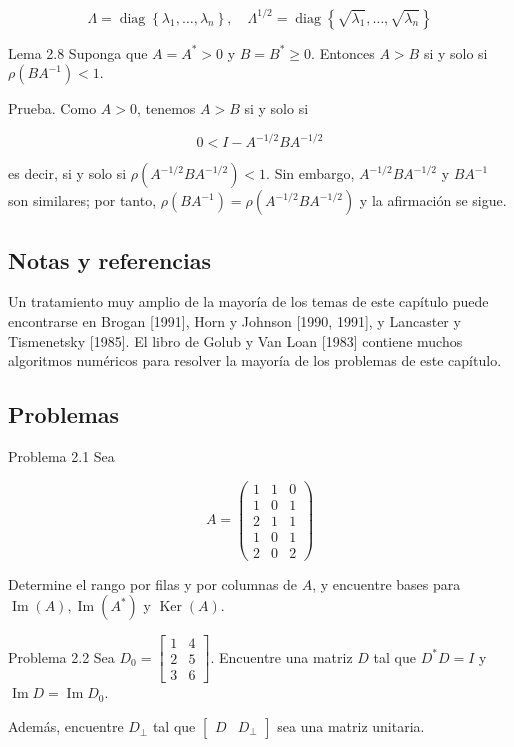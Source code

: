 \documentclass[11pt]{article}
\begin{document}
$$
\Lambda=\operatorname{diag}\left\{\lambda_{1}, \ldots, \lambda_{n}\right\}, \quad \Lambda^{1 / 2}=\operatorname{diag}\left\{\sqrt{\lambda_{1}}, \ldots, \sqrt{\lambda_{n}}\right\}
$$

Lema 2.8 Suponga que $A=A^{*}>0$ y $B=B^{*} \geq 0$. Entonces $A>B$ si y solo si $\rho\left(B A^{-1}\right)<1$.

Prueba. Como $A>0$, tenemos $A>B$ si y solo si

$$
0<I-A^{-1 / 2} B A^{-1 / 2}
$$

es decir, si y solo si $\rho\left(A^{-1 / 2} B A^{-1 / 2}\right)<1$. Sin embargo, $A^{-1 / 2} B A^{-1 / 2}$ y $B A^{-1}$ son similares; por tanto, $\rho\left(B A^{-1}\right)=\rho\left(A^{-1 / 2} B A^{-1 / 2}\right)$ y la afirmación se sigue.

\subsection*{Notas y referencias}
Un tratamiento muy amplio de la mayoría de los temas de este capítulo puede encontrarse en Brogan [1991], Horn y Johnson [1990, 1991], y Lancaster y Tismenetsky [1985]. El libro de Golub y Van Loan [1983] contiene muchos algoritmos numéricos para resolver la mayoría de los problemas de este capítulo.

\subsection*{Problemas}
Problema 2.1 Sea

$$
A=\left(\begin{array}{lll}
1 & 1 & 0 \\
1 & 0 & 1 \\
2 & 1 & 1 \\
1 & 0 & 1 \\
2 & 0 & 2
\end{array}\right)
$$

Determine el rango por filas y por columnas de $A$, y encuentre bases para $\operatorname{Im}(A), \operatorname{Im}\left(A^{*}\right)$ y $\operatorname{Ker}(A)$.

Problema 2.2 Sea $D_{0}=\left[\begin{array}{ll}1 & 4 \\ 2 & 5 \\ 3 & 6\end{array}\right]$. Encuentre una matriz $D$ tal que $D^{*} D=I$ y $\operatorname{Im} D=\operatorname{Im} D_{0}$.

Además, encuentre $D_{\perp}$ tal que $\left[\begin{array}{cc}D & D_{\perp}\end{array}\right]$ sea una matriz unitaria.
\end{document}

